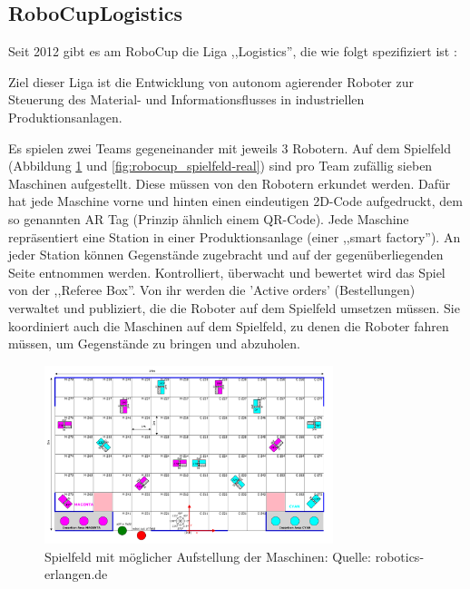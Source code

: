\subsection{RoboCupLogistics}
Seit 2012 gibt es am RoboCup die Liga ,,Logistics'', die wie folgt spezifiziert ist \cite{wikipedia-robocup}:
\begin{formal}
	Ziel dieser Liga ist die Entwicklung von autonom agierender Roboter zur Steuerung des Material- und Informationsflusses in industriellen Produktionsanlagen.
\end{formal}
Es spielen zwei Teams gegeneinander mit jeweils 3 Robotern. Auf dem  Spielfeld (Abbildung \ref{fig:robocup_spielfeld} und \ref{fig:robocup_spielfeld-real}) sind pro Team zufällig sieben Maschinen  aufgestellt. Diese müssen von den Robotern erkundet werden. Dafür hat jede Maschine vorne und hinten einen eindeutigen 2D-Code aufgedruckt, dem so genannten AR Tag (Prinzip ähnlich einem QR-Code). Jede Maschine repräsentiert eine Station in einer Produktionsanlage (einer ,,smart factory''). An jeder Station können Gegenstände zugebracht und auf der gegenüberliegenden Seite entnommen werden. Kontrolliert, überwacht und bewertet wird das Spiel von der ,,Referee Box''. Von ihr werden die 'Active orders' (Bestellungen) verwaltet und publiziert, die die Roboter auf dem Spielfeld umsetzen müssen. Sie koordiniert auch die Maschinen auf dem Spielfeld, zu denen die Roboter fahren müssen, um Gegenstände zu bringen und abzuholen.
\begin{figure}[H]
	\centering
	\includegraphics[width=0.75\textwidth]{img/robocup-spielfeld-2d.png}
	\caption{Spielfeld mit möglicher Aufstellung der Maschinen: Quelle: robotics-erlangen.de \cite{robotics-erlangen.de}}
	\label{fig:robocup_spielfeld}
\end{figure}

